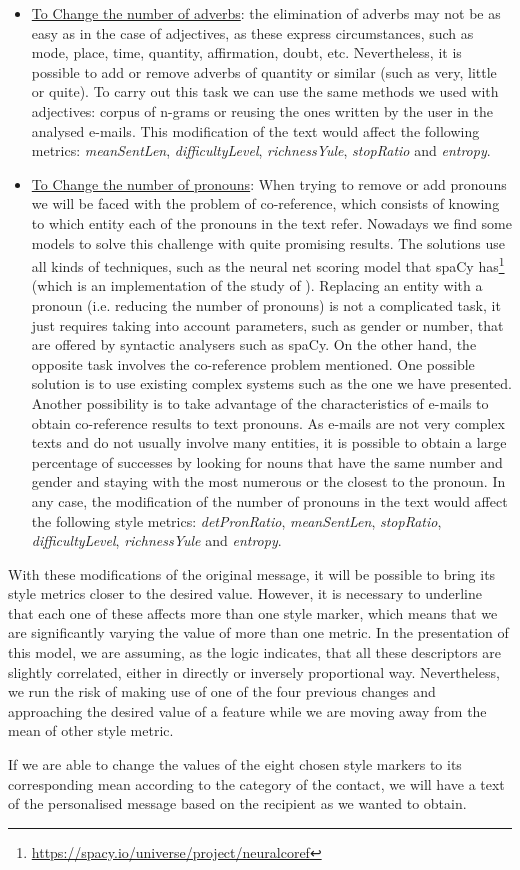 \begin{itemize}
	\item\underline{To Change the number of adverbs}: the elimination of adverbs may not be as easy as in the case of adjectives, as these express circumstances, such as mode, place, time, quantity, affirmation, doubt, etc. Nevertheless, it is possible to add or remove adverbs of quantity or similar (such as very, little or quite). To carry out this task we can use the same methods we used with adjectives: corpus of n-grams or reusing the ones written by the user in the analysed e-mails. This modification of the text would affect the following metrics: \textit{meanSentLen}, \textit{difficultyLevel}, \textit{richnessYule}, \textit{stopRatio} and \textit{entropy}.
	
	\item\underline{To Change the number of pronouns}: When trying to remove or add pronouns we will be faced with the problem of co-reference, which consists of knowing to which entity each of the pronouns in the text refer. Nowadays we find some models to solve this challenge with quite promising results. The solutions use all kinds of techniques, such as the neural net scoring model that spaCy has\footnote{\url{https://spacy.io/universe/project/neuralcoref}} (which is an implementation of the study of \cite{clark2016deep}). Replacing an entity with a pronoun (i.e. reducing the number of pronouns) is not a complicated task, it just requires taking into account parameters, such as gender or number, that are offered by syntactic analysers such as spaCy. On the other hand, the opposite task involves the co-reference problem mentioned. One possible solution is to use existing complex systems such as the one we have presented. Another possibility is to take advantage of the characteristics of e-mails to obtain co-reference results to text pronouns. As e-mails are not very complex texts and do not usually involve many entities, it is possible to obtain a large percentage of successes by looking for nouns that have the same number and gender and staying with the most numerous or the closest to the pronoun. In any case, the modification of the number of pronouns in the text would affect the following style metrics: \textit{detPronRatio}, \textit{meanSentLen}, \textit{stopRatio}, \textit{difficultyLevel}, \textit{richnessYule} and \textit{entropy}.
\end{itemize}

With these modifications of the original message, it will be possible to bring its style metrics closer to the desired value. However, it is necessary to underline that each one of these affects more than one style marker, which means that we are significantly varying the value of more than one metric. In the presentation of this model, we are assuming, as the logic indicates, that all these descriptors are slightly correlated, either in directly or inversely proportional way. Nevertheless, we run the risk of making use of one of the four previous changes and approaching the desired value of a feature while we are moving away from the mean of other style metric.

If we are able to change the values of the eight chosen style markers to its corresponding mean according to the category of the contact, we will have a text of the personalised message based on the recipient as we wanted to obtain.